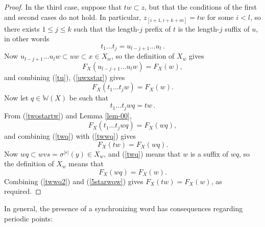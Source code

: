 \documentclass[reqno,11pt]{amsart}
\theoremstyle{definition}
\theoremstyle{remark}
\theoremstyle{remark}
\def\w{\mathbb{W}}
\numberwithin{equation}{section}
\begin{document}
\begin{proof}
In the third case, suppose that $tw\subset z$, but that the conditions of the first and second cases do not hold.
In particular, $z_{[i+1,i+k+m]}=tw$ for some $i<l$, so there exists $1\le j\le k$ such that
the length-$j$ prefix of $t$ is the length-$j$ suffix of $u$, in other words
\begin{equation}\label{tu}
t_1\ldots t_j = u_{l-j+1}\ldots u_l\,.
\end{equation}
Now $u_{l-j+1}\ldots u_l w \subset uw\subset x\in X_w$, so the definition of $X_w$ gives
\begin{equation}\label{uwxstar}
F_X(u_{l-j+1}\ldots u_l w) = F_X(w),
\end{equation}
and combining (\ref{tu}), (\ref{uwxstar}) gives
\begin{equation}\label{twostartw}
F_X(t_1\ldots t_j w)=F_X(w).
\end{equation}
Now let $q\in\w(X)$ be such that
\begin{equation}\label{twq}
t_1\ldots t_j wq = tw\,.
\end{equation}
From (\ref{twostartw}) and Lemma \ref{lem-00},
\begin{equation}\label{twwq}
F_X(t_1\ldots t_j wq) = F_X(wq),
\end{equation}
and combining  (\ref{twq}) with (\ref{twwq}) gives
\begin{equation}\label{twwq2}
F_X(tw)=F_X(wq).
\end{equation}
Now $wq\subset wvs = \sigma^{|r|}(y)\in X_w$, and (\ref{twq}) means that $w$ is a suffix of $wq$,
so the definition of $X_w$ means that 
\begin{equation}\label{5starwqw}
F_X(wq)=F_X(w).
\end{equation}
Combining (\ref{twwq2}) and (\ref{5starwqw}) gives $F_X(tw)=F_X(w)$, as required.
\end{proof}



In general, the presence of a synchronizing word has consequences regarding periodic points:
\end{document}
